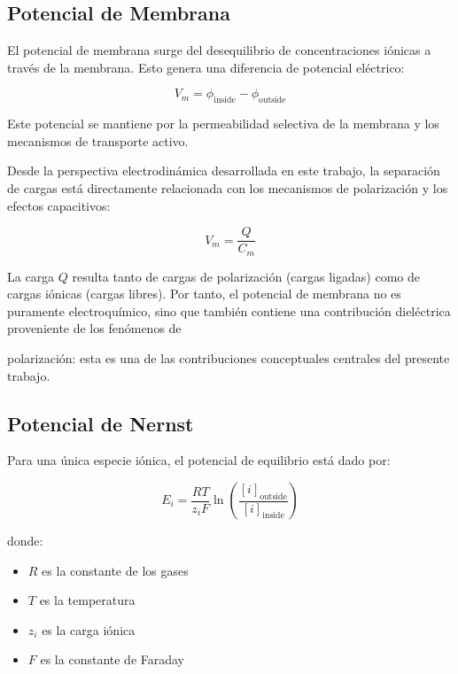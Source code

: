 \documentclass[12pt]{article}
\begin{document}
\subsection{Potencial de Membrana}

El potencial de membrana surge del desequilibrio de concentraciones i\'onicas a trav\'es de la
membrana. Esto genera una diferencia de potencial el\'ectrico:

\begin{equation}
V_m = \phi_{\text{inside}} - \phi_{\text{outside}}
\end{equation}

Este potencial se mantiene por la permeabilidad selectiva de la membrana y los mecanismos de
transporte activo.

Desde la perspectiva electrodin\'amica desarrollada en este trabajo, la separaci\'on de cargas
est\'a directamente relacionada con los mecanismos de polarizaci\'on y los efectos capacitivos:

\begin{equation}
V_m = \frac{Q}{C_m}
\end{equation}

La carga $Q$ resulta tanto de cargas de polarizaci\'on (cargas ligadas) como de cargas i\'onicas
(cargas libres). Por tanto, el potencial de membrana no es puramente electroqu\'imico, sino que
tambi\'en contiene una contribuci\'on diel\'ectrica proveniente de los fen\'omenos de

polarizaci\'on: esta es una de las contribuciones conceptuales centrales del presente trabajo.

\subsection{Potencial de Nernst}

Para una \'unica especie i\'onica, el potencial de equilibrio est\'a dado por:

\begin{equation}
E_i =
\frac{RT}{z_i F}
\ln\left(
\frac{[i]_{\text{outside}}}{[i]_{\text{inside}}}
\right)
\end{equation}

donde:

\begin{itemize}
\item $R$ es la constante de los gases
\item $T$ es la temperatura
\item $z_i$ es la carga i\'onica
\item $F$ es la constante de Faraday
\end{itemize}
\end{document}
